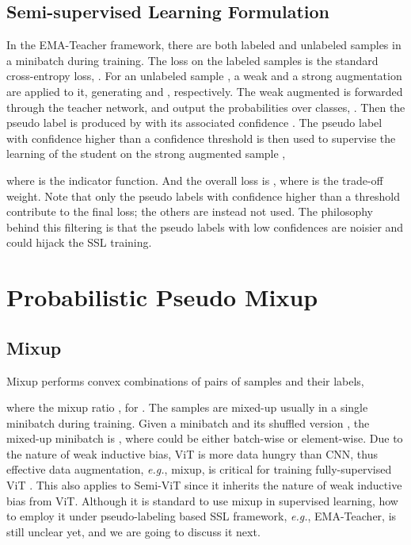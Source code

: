\documentclass{article}
\newcommand\eg{\emph{e.g.}}
\begin{document}
\subsection{Semi-supervised Learning Formulation}

In the EMA-Teacher framework, there are both labeled and unlabeled
samples in a minibatch during training. 
The loss on the labeled samples  is the standard cross-entropy loss, . For an unlabeled sample , a weak and a strong augmentation are applied to it, generating  and , respectively. The weak augmented  is forwarded through the teacher network, and output the probabilities over classes, . Then the pseudo label is produced by  with its associated confidence . The pseudo label with confidence higher than a confidence threshold  is then used to supervise the learning of the student on the strong augmented sample ,

where  is the indicator function. And the overall loss is , where  is the trade-off weight. Note that only the pseudo labels with confidence higher than a threshold contribute to the final loss; the others are instead not used. The philosophy behind this filtering is that the pseudo labels with low confidences are noisier and could hijack the SSL training.  


\section{Probabilistic Pseudo Mixup}
\label{sec:mixup}

\subsection{Mixup}

Mixup \cite{DBLP:conf/iclr/ZhangCDL18} performs convex combinations of pairs of samples and their labels,

where the mixup ratio , for . The samples are mixed-up usually in a single minibatch during training. Given a minibatch  and its shuffled version , the mixed-up minibatch is , where  could be either batch-wise or element-wise. Due to the nature of weak inductive bias, ViT is more data hungry than CNN, thus effective data augmentation, \eg, mixup, is critical for training fully-supervised ViT \cite{DBLP:conf/iclr/DosovitskiyB0WZ21,DBLP:conf/icml/TouvronCDMSJ21,DBLP:conf/iccv/LiuL00W0LG21,DBLP:conf/iccv/XuXCT21}. This also applies to Semi-ViT since it inherits the nature of weak inductive bias from ViT. Although it is standard to use mixup in supervised learning, how to employ it under pseudo-labeling based SSL framework, \eg, EMA-Teacher, is still unclear yet, and we are going to discuss it next.
\end{document}

